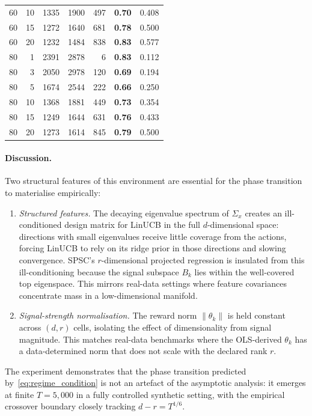 \documentclass{article}
\begin{document}
{\begin{table}[!htpb]
\begin{tabular}{rr|rrr|cc}
60 & 10 & 1335 & 1900 &  497 & \textbf{0.70} & 0.408 \\
60 & 15 & 1272 & 1640 &  681 & \textbf{0.78} & 0.500 \\
60 & 20 & 1232 & 1484 &  838 & \textbf{0.83} & 0.577 \\
\midrule
80 &  1 & 2391 & 2878 &    6 & \textbf{0.83} & 0.112 \\
80 &  3 & 2050 & 2978 &  120 & \textbf{0.69} & 0.194 \\
80 &  5 & 1674 & 2544 &  222 & \textbf{0.66} & 0.250 \\
80 & 10 & 1368 & 1881 &  449 & \textbf{0.73} & 0.354 \\
80 & 15 & 1249 & 1644 &  631 & \textbf{0.76} & 0.433 \\
80 & 20 & 1273 & 1614 &  845 & \textbf{0.79} & 0.500 \\
\bottomrule
\end{tabular}
\end{table}

\paragraph{Discussion.}
Two structural features of this environment are essential for the
phase transition to materialise empirically:
\begin{enumerate}[nosep,leftmargin=1.5em]
  \item \emph{Structured features.}
  The decaying eigenvalue spectrum of $\Sigma_x$ creates an
  ill-conditioned design matrix for LinUCB in the full
  $d$-dimensional space: directions with small eigenvalues receive
  little coverage from the actions, forcing LinUCB to rely on its
  ridge prior in those directions and slowing convergence.
  SPSC's $r$-dimensional projected regression is insulated from
  this ill-conditioning because the signal subspace $B_k$ lies
  within the well-covered top eigenspace.
  This mirrors real-data settings where feature covariances
  concentrate mass in a low-dimensional manifold.

  \item \emph{Signal-strength normalisation.}
  The reward norm $\|\theta_k\|$ is held constant across
  $(d,r)$ cells, isolating the effect of dimensionality
  from signal magnitude.
  This matches real-data benchmarks where the OLS-derived
  $\theta_k$ has a data-determined norm that does not scale with
  the declared rank $r$.
\end{enumerate}
The experiment demonstrates that the phase transition predicted
by~\eqref{eq:regime_condition} is not an artefact of the
asymptotic analysis: it emerges at finite $T{=}5{,}000$ in a
fully controlled synthetic setting, with the empirical crossover
boundary closely tracking $d - r = T^{1/6}$.

}
\end{document}
